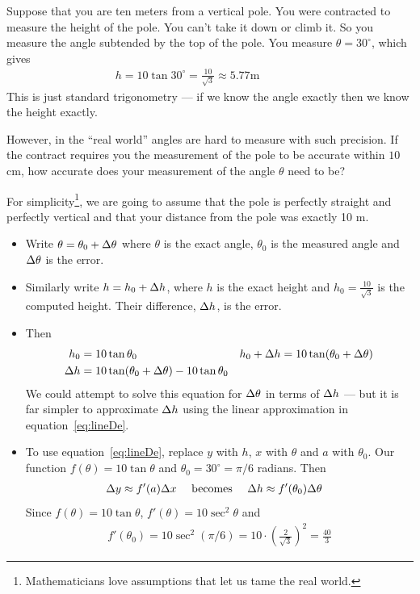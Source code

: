 \begin{eg}\label{eg:taylorPole}
Suppose that you are ten meters from a vertical pole. You were
contracted to measure the height of the pole. You can't
take it down or climb it. So you measure the angle subtended by
the top of the pole. You measure $\theta=30^\circ$,  which gives
\begin{align*}
h=10\tan 30^\circ=\tfrac{10}{\sqrt{3}}\approx 5.77\text{m}\qquad\qquad
\end{align*}
This is just standard trigonometry ---  if we know the angle exactly then we know the
height exactly.

However, in the ``real world'' angles are hard to measure with such precision. If the
contract requires you the measurement of the pole to be accurate within $10$ cm, how
accurate does your measurement of the angle $\theta$ need to be?

\soln For simplicity\footnote{Mathematicians love assumptions that let us tame the real
world.}, we are going to assume that the pole is perfectly straight
and perfectly vertical and that your distance from the pole was exactly
10 m.
\begin{itemize}
\item Write $\theta=\theta_0+\Delta\theta$ where $\theta$ is the exact angle, $\theta_0$ is
the measured angle and $\Delta \theta$ is the error.
\item Similarly write $h=h_0+\Delta h$, where $h$ is the exact height and
$h_0=\tfrac{10}{\sqrt{3}}$ is the computed height. Their difference,
$\Delta h$, is the error.

\item Then
\begin{align*}
h_0&=10\tan\theta_0 & h_0+\Delta h&=10\tan(\theta_0+\Delta\theta)\\
\Delta h &= 10\tan(\theta_0+\Delta\theta) - 10\tan\theta_0
\end{align*}
We could attempt to solve this equation for $\Delta\theta$ in terms of $\Delta h$ --- but it is
far simpler to approximate $\Delta h$ using the linear approximation in
equation~\ref{eq:lineDe}.

\item To use equation~\ref{eq:lineDe}, replace $y$ with $h$, $x$ with $\theta$ and $a$
with $\theta_0$. Our function $f(\theta) = 10 \tan\theta$ and $\theta_0 = 30^\circ =
\pi/6$ radians. Then
\begin{align*}
  \Delta y &\approx f'(a) \Delta x & \text{ becomes }&&
  \Delta h &\approx f'(\theta_0) \Delta \theta
\end{align*}
Since $f(\theta)=10 \tan \theta$, $f'(\theta) = 10\sec^2\theta$ and
\begin{align*}
  f'(\theta_0) = 10\sec^2(\pi/6)
  = 10 \cdot \left(\frac{2}{\sqrt{3}} \right)^2 = \frac{40}{3}
\end{align*}


\end{itemize}
\end{eg}
